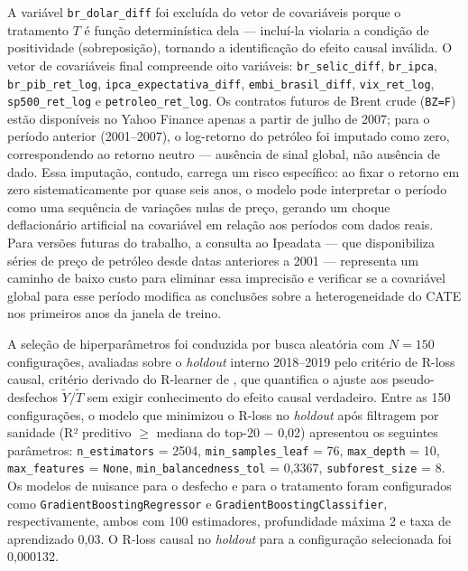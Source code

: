 \documentclass[	12pt, Times, openright, oneside, a4paper, english, brazil]{abntex2}
\begin{document}
\begin{sloppypar}
A variável \texttt{br\_dolar\_diff} foi excluída do vetor de covariáveis porque o tratamento $T$ é função determinística dela — incluí-la violaria a condição de positividade (sobreposição), tornando a identificação do efeito causal inválida. O vetor de covariáveis final compreende oito variáveis: \texttt{br\_selic\_diff}, \texttt{br\_ipca}, \texttt{br\_pib\_ret\_log}, \texttt{ipca\_expectativa\_diff}, \texttt{embi\_brasil\_diff}, \texttt{vix\_ret\_log}, \texttt{sp500\_ret\_log} e \texttt{petroleo\_ret\_log}. Os contratos futuros de Brent crude (\texttt{BZ=F}) estão disponíveis no Yahoo Finance apenas a partir de julho de 2007; para o período anterior (2001--2007), o log-retorno do petróleo foi imputado como zero, correspondendo ao retorno neutro — ausência de sinal global, não ausência de dado. Essa imputação, contudo, carrega um risco específico: ao fixar o retorno em zero sistematicamente por quase seis anos, o modelo pode interpretar o período como uma sequência de variações nulas de preço, gerando um choque deflacionário artificial na covariável em relação aos períodos com dados reais. Para versões futuras do trabalho, a consulta ao Ipeadata — que disponibiliza séries de preço de petróleo desde datas anteriores a 2001 — representa um caminho de baixo custo para eliminar essa imprecisão e verificar se a covariável global para esse período modifica as conclusões sobre a heterogeneidade do CATE nos primeiros anos da janela de treino.
\end{sloppypar}

\begin{sloppypar}
A seleção de hiperparâmetros foi conduzida por busca aleatória com $N = 150$ configurações, avaliadas sobre o \textit{holdout} interno 2018--2019 pelo critério de R-loss causal, critério derivado do R-learner de , que quantifica o ajuste aos pseudo-desfechos $\tilde{Y} / \tilde{T}$ sem exigir conhecimento do efeito causal verdadeiro. Entre as 150 configurações, o modelo que minimizou o R-loss no \textit{holdout} após filtragem por sanidade (R² preditivo $\geq$ mediana do top-20 $-$ 0,02) apresentou os seguintes parâmetros: \texttt{n\_estimators} = 2504, \texttt{min\_samples\_leaf} = 76, \texttt{max\_depth} = 10, \texttt{max\_features} = \texttt{None}, \texttt{min\_balancedness\_tol} = 0,3367, \texttt{subforest\_size} = 8. Os modelos de nuisance para o desfecho e para o tratamento foram configurados como \texttt{GradientBoostingRegressor} e \texttt{GradientBoostingClassifier}, respectivamente, ambos com 100 estimadores, profundidade máxima 2 e taxa de aprendizado 0,03. O R-loss causal no \textit{holdout} para a configuração selecionada foi 0,000132.
\end{sloppypar}
\end{document}
